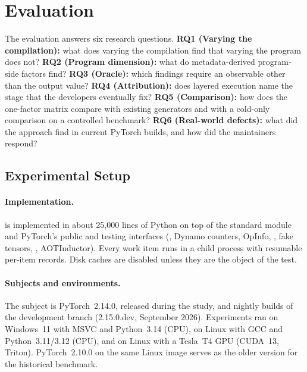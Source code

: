 \section{Evaluation}
\label{sec:eval}

The evaluation answers six research questions.
\textbf{RQ1 (Varying the compilation):} what does varying the compilation find that varying the program does not?
\textbf{RQ2 (Program dimension):} what do metadata-derived program-side factors find?
\textbf{RQ3 (Oracle):} which findings require an observable other than the output value?
\textbf{RQ4 (Attribution):} does layered execution name the stage that the developers eventually fix?
\textbf{RQ5 (Comparison):} how does the one-factor matrix compare with existing generators and with a cold-only
comparison on a controlled benchmark?
\textbf{RQ6 (Real-world defects):} what did the approach find in current PyTorch builds, and how did the
maintainers respond?

\subsection{Experimental Setup}
\label{sec:setup}

\paragraph{Implementation.} \tool is implemented in about 25{,}000 lines of Python on top of the standard
 module and PyTorch's public and testing interfaces (, Dynamo counters, OpInfo,
, fake tensors, , AOTInductor). Every work item runs in a child
process with resumable per-item records. Disk caches are disabled unless they are the object of the test.

\paragraph{Subjects and environments.} The subject is PyTorch~2.14.0, released during the study, and nightly
builds of the development branch (2.15.0.dev, September 2026). Experiments ran on Windows~11 with MSVC and
Python~3.14 (CPU), on Linux with GCC and Python~3.11/3.12 (CPU), and on Linux with a Tesla~T4 GPU (CUDA~13,
Triton). PyTorch~2.10.0 on the same Linux image serves as the older version for the historical benchmark.


